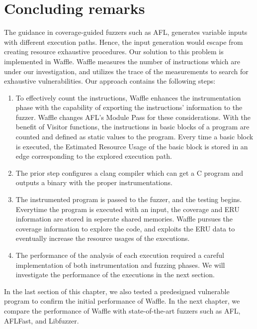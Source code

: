 \newpage
\section{Concluding remarks}

The guidance in coverage-guided fuzzers such as AFL, generates variable inputs with different execution paths. Hence, the input generation would escape from creating resource exhaustive procedures. Our solution to this problem is implemented in Waffle. Waffle measures the number of instructions which are under our investigation, and utilizes the trace of the measurements to search for exhaustive vulnerabilities. Our approach contains the following steps: 

\begin{enumerate}
    \item To effectively count the instructions, Waffle enhances the instrumentation phase with the capability of exporting the instructions' information to the fuzzer. Waffle changes AFL's Module Pass for these considerations. With the benefit of Visitor functions, the instructions in basic blocks of a program are counted and defined as static values to the program. Every time a basic block is executed, the Estimated Resource Usage of the basic block is stored in an edge corresponding to the explored execution path.
    \item The prior step configures a clang compiler which can get a C program and outputs a binary with the proper instrumentations.
    \item The instrumented program is passed to the fuzzer, and the testing begins. Everytime the program is executed with an input, the coverage and ERU information are stored in seperate shared memories. Waffle pursues the coverage information to explore the code, and exploits the ERU data to eventually increase the resource usages of the executions.
    \item The performance of the analysis of each execution required a careful implementation of both instrumentation and fuzzing phases. We will investigate the performance of the executions in the next section.
\end{enumerate}

In the last section of this chapter, we also tested a predesigned vulnerable program to confirm the initial performance of Waffle. In the next chapter, we compare the performance of Waffle with state-of-the-art fuzzers such as AFL, AFLFast, and Libfuzzer.
